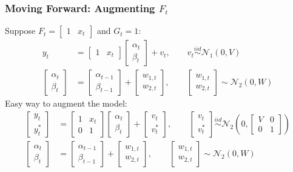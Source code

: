 \documentclass[xcolor=dvipsnames]{beamer}
\newcommand\N{\mathcal{N}}
\begin{document}
\begin{frame}
\frametitle{Moving Forward: Augmenting $F_t$}
Suppose $F_t=\begin{bmatrix}1 & x_t\end{bmatrix}$ and $G_t=1$:
\begin{align*}
y_t &= \begin{bmatrix}1 & x_t\end{bmatrix}\begin{bmatrix}\alpha_t \\ \beta_t\end{bmatrix} + v_t, \qquad v_t\stackrel{iid}{\sim}\N_1(0,V)\\
\begin{bmatrix}\alpha_t \\ \beta_t\end{bmatrix} &= \begin{bmatrix}\alpha_{t-1} \\ \beta_{t-1}\end{bmatrix} + \begin{bmatrix}w_{1,t} \\ w_{2,t}\end{bmatrix}, \qquad \begin{bmatrix}w_{1,t} \\ w_{2,t}\end{bmatrix}\sim\N_2(0,W)
\end{align*}
Easy way to augment the model:
\begin{align*}
\begin{bmatrix}y_t \\ y_t^*\end{bmatrix} &= \begin{bmatrix}1 & x_t\\ 0 & 1\end{bmatrix}\begin{bmatrix}\alpha_t \\ \beta_t\end{bmatrix} + \begin{bmatrix}v_t \\ v_t^* \end{bmatrix}, \qquad \begin{bmatrix} v_t\\ v_t^* \end{bmatrix}\stackrel{iid}{\sim}\N_2\left(0,\begin{bmatrix}V & 0 \\ 0 & 1\end{bmatrix}\right)\\
\begin{bmatrix}\alpha_t \\ \beta_t\end{bmatrix} &= \begin{bmatrix}\alpha_{t-1} \\ \beta_{t-1}\end{bmatrix} + \begin{bmatrix}w_{1,t} \\ w_{2,t}\end{bmatrix}, \qquad \begin{bmatrix}w_{1,t} \\ w_{2,t}\end{bmatrix}\sim\N_2(0,W)

\end{align*}
\end{frame}
\end{document}
